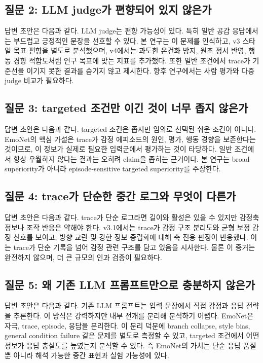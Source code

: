 \documentclass[11pt,a4paper]{article}
\begin{document}
\subsection{질문 2: LLM judge가 편향되어 있지 않은가}

답변 초안은 다음과 같다. LLM judge는 편향 가능성이 있다. 특히 일반 공감 응답에서는 부드럽고 긍정적인 문장을 선호할 수 있다. 본 연구는 이 문제를 인식하고, v3 스타일 목표 편향을 별도로 분석했으며, v4에서는 과도한 온건화 방지, 원초 정서 반영, 행동 경향 적합도처럼 연구 목표에 맞는 지표를 추가했다. 또한 일반 조건에서 trace가 기준선을 이기지 못한 결과를 숨기지 않고 제시한다. 향후 연구에서는 사람 평가와 다중 judge 비교가 필요하다.

\subsection{질문 3: targeted 조건만 이긴 것이 너무 좁지 않은가}

답변 초안은 다음과 같다. targeted 조건은 좁지만 임의로 선택된 쉬운 조건이 아니다. EmoNet의 핵심 가설은 trace가 감정 에피소드의 원인, 평가, 행동 경향을 보존한다는 것이므로, 이 정보가 실제로 필요한 입력군에서 평가하는 것이 타당하다. 일반 조건에서 항상 우월하지 않다는 결과는 오히려 claim을 좁히는 근거이다. 본 연구는 broad superiority가 아니라 episode-sensitive targeted superiority를 주장한다.

\subsection{질문 4: trace가 단순한 중간 로그와 무엇이 다른가}

답변 초안은 다음과 같다. trace가 단순 로그라면 길이와 활성은 있을 수 있지만 감정축 정보나 조작 반응은 약해야 한다. v3.1에서는 trace가 감정 구조 분리도와 균형 보정 감정 신호를 보이고, 방향 교란 및 강한 정보 중립화에 대해 축 전용 판정이 반응했다. 이는 trace가 단순 기록을 넘어 감정 관련 구조를 담고 있음을 시사한다. 물론 이 증거는 완전하지 않으며, 더 큰 규모의 인과 검증이 필요하다.

\subsection{질문 5: 왜 기존 LLM 프롬프트만으로 충분하지 않은가}

답변 초안은 다음과 같다. 기존 LLM 프롬프트는 입력 문장에서 직접 감정과 응답 전략을 추론한다. 이 방식은 강력하지만 내부 전개를 분리해 분석하기 어렵다. EmoNet은 자극, trace, episode, 응답을 분리한다. 이 분리 덕분에 branch collapse, style bias, general condition failure 같은 문제를 별도로 측정할 수 있고, targeted 조건에서 어떤 정보가 응답 충실도를 높였는지 분석할 수 있다. 즉 EmoNet의 가치는 단순 응답 품질뿐 아니라 해석 가능한 중간 표현과 실험 가능성에 있다.
\end{document}
